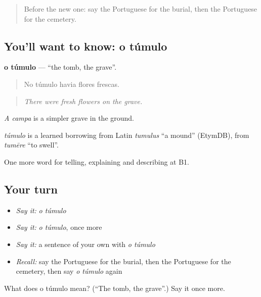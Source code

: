 \label{lesson:PT-C315-tumulo}



\begin{quote}
Before the new one: say the Portuguese for the burial, then the Portuguese for the cemetery.
\end{quote}

\subsection*{You'll want to know: o túmulo}
\textbf{o túmulo} — \textquotedblleft{}the tomb, the grave\textquotedblright{}.

\begin{quote}
No túmulo havia flores frescas.
\end{quote}

\begin{quote}
\emph{There were fresh flowers on the grave.}
\end{quote}

\emph{A campa} is a simpler grave in the ground.

\begin{cousinweb}
\emph{túmulo} is a learned borrowing from Latin \emph{tumulus} \textquotedblleft{}a mound\textquotedblright{} (EtymDB), from \emph{tumēre} \textquotedblleft{}to swell\textquotedblright{}.
\end{cousinweb}

\begin{grammarlens}[title={What you've built}]
One more word for telling, explaining and describing at B1.
\end{grammarlens}

\subsection*{Your turn}
\begin{itemize}
\raggedright
  \item \emph{Say it:} \emph{o túmulo}
  \item \emph{Say it:} \emph{o túmulo}, once more
  \item \emph{Say it:} a sentence of your own with \emph{o túmulo}
  \item \emph{Recall:} say the Portuguese for the burial, then the Portuguese for the cemetery, then say \emph{o túmulo} again
\end{itemize}

\begin{tcolorbox}[breakable,colback=teal!4,colframe=teal!35!black,title={Before you move on}]
What does o túmulo mean? (\textquotedblleft{}The tomb, the grave\textquotedblright{}.) Say it once more.
\end{tcolorbox}
